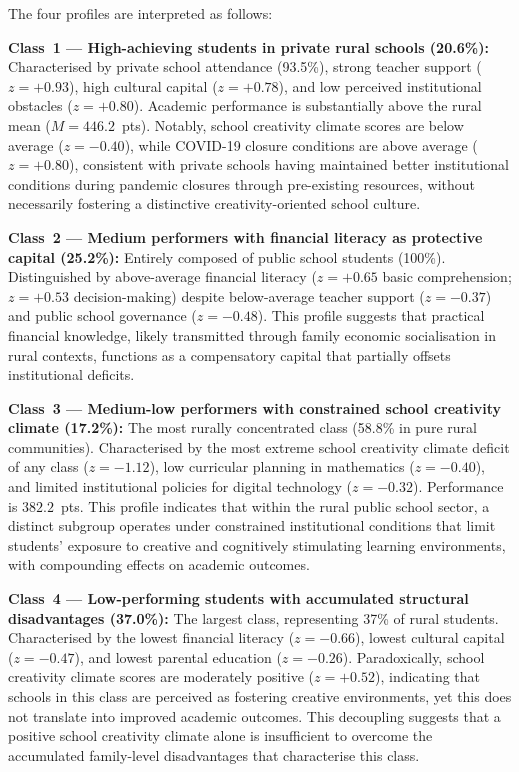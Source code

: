 \documentclass[twocolumn,12pt]{article}
\begin{document}
The four profiles are interpreted as follows:

\textbf{Class~1 --- High-achieving students in private rural schools
(20.6\%):} Characterised by private school attendance (93.5\%), strong
teacher support ($z = +0.93$), high cultural capital ($z = +0.78$), and
low perceived institutional obstacles ($z = +0.80$). Academic performance
is substantially above the rural mean ($M = 446.2$~pts). Notably, school
creativity climate scores are below average
($z = -0.40$), while COVID-19 closure conditions are above
average ($z = +0.80$), consistent with private schools having
maintained better institutional conditions during pandemic
closures through pre-existing resources, without necessarily
fostering a distinctive creativity-oriented school culture.

\textbf{Class~2 --- Medium performers with financial literacy as protective
capital (25.2\%):} Entirely composed of public school students (100\%).
Distinguished by above-average financial literacy ($z = +0.65$ basic
comprehension; $z = +0.53$ decision-making) despite below-average teacher
support ($z = -0.37$) and public school governance ($z = -0.48$). This
profile suggests that practical financial knowledge, likely transmitted
through family economic socialisation in rural contexts, functions as a
compensatory capital that partially offsets institutional deficits.

\textbf{Class~3 --- Medium-low performers with constrained school
creativity climate (17.2\%):} The most rurally concentrated class
(58.8\% in pure rural communities). Characterised by the most
extreme school creativity climate deficit of any class
($z = -1.12$), low curricular planning in mathematics
($z = -0.40$), and limited institutional policies for digital
technology ($z = -0.32$). Performance is $382.2$~pts. This
profile indicates that within the rural public school sector, a
distinct subgroup operates under constrained institutional
conditions that limit students' exposure to creative and
cognitively stimulating learning environments, with compounding
effects on academic outcomes.

\textbf{Class~4 --- Low-performing students with accumulated structural
disadvantages (37.0\%):} The largest class, representing 37\% of rural
students. Characterised by the lowest financial literacy ($z = -0.66$),
lowest cultural capital ($z = -0.47$), and lowest parental education
($z = -0.26$). Paradoxically, school creativity climate scores are moderately
positive ($z = +0.52$), indicating that schools in this class
are perceived as fostering creative environments, yet this does
not translate into improved academic outcomes. This decoupling
suggests that a positive school creativity climate alone is
insufficient to overcome the accumulated family-level
disadvantages that characterise this class.
\end{document}
